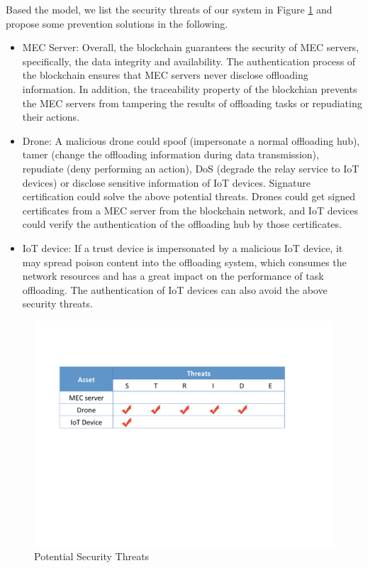 Based the model, we list the security threats of our system in Figure \ref{fig:security-analysis} and propose some prevention solutions in the following.
 \begin{itemize}
\item MEC Server: Overall, the blockchain guarantees the security of MEC servers, specifically, the data integrity and availability.
The authentication process of the blockchain ensures that MEC servers never disclose offloading information. 
In addition, the traceability property of the blockchian prevents the MEC servers from tampering the results of offloading tasks or repudiating their actions.
\item Drone: A malicious drone could spoof (impersonate a normal offloading hub), tamer (change the offloading information during data transmission), repudiate (deny performing an action), DoS (degrade the relay service to IoT devices) or disclose sensitive information of IoT devices.
Signature certification could solve the above potential threats.
Drones could get signed certificates from a MEC server from the blockchain network, and IoT devices could verify the authentication of the offloading hub by those certificates.
\item IoT device: If a trust device is impersonated by a malicious IoT device, it may spread poison content into the offloading system, which consumes the network resources and has a great impact on the performance of task offloading.
The authentication of IoT devices can also avoid the above security threats. 
\end{itemize}


\begin{figure}[t]
\centering
\includegraphics[width=3.3 in]{Fig/SecurityAnalysis.pdf}
\caption{Potential Security Threats}
\label{fig:security-analysis}
\end{figure}

